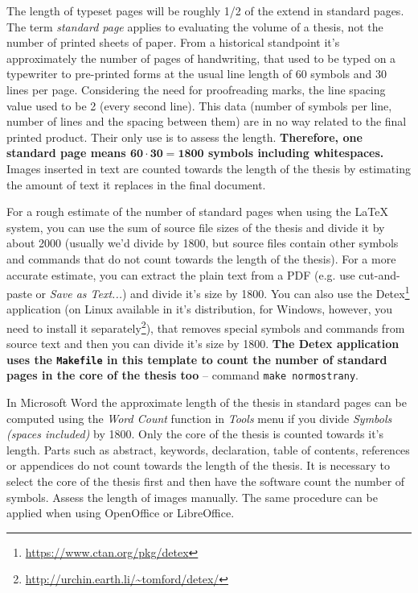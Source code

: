 The length of typeset pages will be roughly 1/2 of the extend in standard pages. The term {\it standard page} applies to evaluating the volume of a thesis, not the number of printed sheets of paper. From a historical standpoint it's approximately the number of pages of handwriting, that used to be typed on a typewriter to pre-printed forms at the usual line length of 60 symbols and 30 lines per page. Considering the need for proofreading marks, the line spacing value used to be 2 (every second line). This data (number of symbols per line, number of lines and the spacing between them) are in no way related to the final printed product. Their only use is to assess the length. \textbf{Therefore, one standard page means $\mathbf{60\cdot 30 = 1800}$ symbols including whitespaces.} Images inserted in text are counted towards the length of the thesis by estimating the amount of text it replaces in the final document.

For a rough estimate of the number of standard pages when using the \LaTeX{} system, you can use the sum of source file sizes of the thesis and divide it by about 2000 (usually we'd divide by 1800, but source files contain other symbols and commands that do not count towards the length of the thesis). For a more accurate estimate, you can extract the plain text from a PDF (e.g. use cut-and-paste or {\it Save as Text...}) and divide it's size by 1800. You can also use the Detex\footnote{\url{https://www.ctan.org/pkg/detex}} application (on Linux available in it's distribution, for Windows, however, you need to install it separately\footnote{\url{http://urchin.earth.li/~tomford/detex/}}), that removes special symbols and commands from source text and then you can divide it's size by 1800. \textbf{The Detex application uses the \texttt{Makefile} in this template to count the number of standard pages in the core of the thesis too} -- command \verb|make normostrany|.

In Microsoft Word the approximate length of the thesis in standard pages can be computed using the {\it Word Count} function in {\it Tools} menu if you divide {\it Symbols (spaces included)} by 1800. Only the core of the thesis is counted towards it's length. Parts such as abstract, keywords, declaration, table of contents, references or appendices do not count towards the length of the thesis. It is necessary to select the core of the thesis first and then have the software count the number of symbols. Assess the length of images manually. The same procedure can be applied when using OpenOffice or LibreOffice. 

